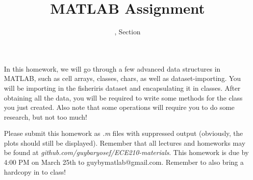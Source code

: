\documentclass[11pt]{article}
\title{MATLAB Assignment \Homework}
\author{\Session, Section \Section}
\date{}
\makeatletter
\def\MyEmail{guybymatlab@gmail.com}
\def\DateOfSubmission{March 25th }
\makeatother
\begin{document}
\maketitle
In this homework, we will go through a few advanced data structures in MATLAB,
such as cell arrays, classes, chars, as well as dataset-importing.
You will be importing in the fisheriris dataset and encapsulating it in classes.
After obtaining all the data, you will be required to write some methods for
the class you just created.
Also note that some operations will require you to do some research, but not too much!

Please submit this homework as \textit{.m} files 
with suppressed output (obviously, the plots should still be displayed).
Remember that all lectures and homeworks may be found at 
\textit{github.com/guybaryosef/ECE210-materials}.
This homework is due by 4:00 PM on \DateOfSubmission to \MyEmail.
Remember to also bring a hardcopy in to class!
\end{document}
